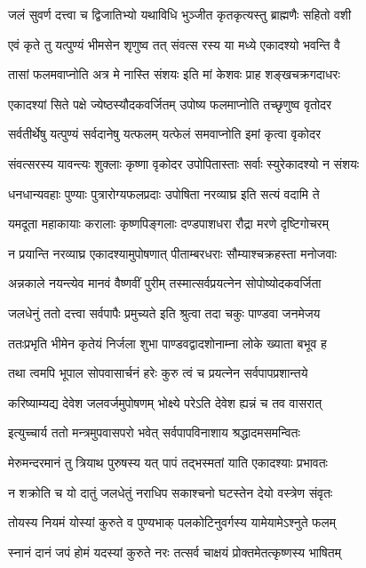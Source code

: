 \twolineshloka
{जलं सुवर्ण दत्त्वा च द्विजातिभ्यो यथाविधि}
{भुञ्जीत कृतकृत्यस्तु ब्राह्मणैः सहितो वशी} %

\twolineshloka
{एवं कृते तु यत्पुण्यं भीमसेन शृणुष्व तत्}
{संवत्स रस्य या मध्ये एकादश्यो भवन्ति वै} %

\twolineshloka
{तासां फलमवाप्नोति अत्र मे नास्ति संशयः}
{इति मां केशवः प्राह शङ्खचक्रगदाधरः} %

\twolineshloka
{एकादश्यां सिते पक्षे ज्येष्ठस्यौदकवर्जितम्}
{उपोष्य फलमाप्नोति तच्छृणुष्व वृतोदर} %

\twolineshloka
{सर्वतीर्थेषु यत्पुण्यं सर्वदानेषु यत्फलम्}
{यत्फेलं समवाप्नोति इमां कृत्वा वृकोदर} %

\twolineshloka
{संवत्सरस्य यावन्त्यः शुक्लाः कृष्णा वृकोदर}
{उपोपितास्ताः सर्वाः स्युरेकादश्यो न संशयः} %

\twolineshloka
{धनधान्यवहाः पुण्याः पुत्रारोग्यफलप्रदाः}
{उपोषिता नरव्याघ्र इति सत्यं वदामि ते} %

\twolineshloka
{यमदूता महाकायाः करालाः कृष्णपिङ्गलाः}
{दण्डपाशधरा रौद्रा मरणे दृष्टिगोचरम्} %

\twolineshloka
{न प्रयान्ति नरव्याघ्र एकादश्यामुपोषणात्}
{पीताम्बरधराः सौम्याश्चक्रहस्ता मनोजवाः} %

\twolineshloka
{अन्नकाले नयन्त्येव मानवं वैष्णवीं पुरीम्}
{तस्मात्सर्वप्रयत्नेन सोपोष्योदकवर्जिता} %

\twolineshloka
{जलधेनुं ततो दत्त्वा सर्वपापैः प्रमुच्यते}
{इति श्रुत्वा तदा चकुः पाण्डवा जनमेजय} %

\twolineshloka
{ततःप्रभृति भीमेन कृतेयं निर्जला शुभा}
{पाण्डवद्वादशोनाम्ना लोके ख्याता बभूव ह} %

\twolineshloka
{तथा त्वमपि भूपाल सोपवासार्चनं हरेः}
{कुरु त्वं च प्रयत्नेन सर्वपापप्रशान्तये} %

\twolineshloka
{करिष्याम्यद्य देवेश जलवर्जमुपोषणम्}
{भोक्ष्ये परेऽति देवेश ह्यन्नं च तव वासरात्} %

\twolineshloka
{इत्युच्चार्य ततो मन्त्रमुपवासपरो भवेत्}
{सर्वपापविनाशाय श्रद्धादमसमन्वितः} %

\twolineshloka
{मेरुमन्दरमानं तु त्रियाथ पुरुषस्य यत्}
{पापं तद्भस्मतां याति एकादश्याः प्रभावतः} %

\twolineshloka
{न शक्रोति च यो दातुं जलधेतुं नराधिप}
{सकाश्चनो घटस्तेन देयो वस्त्रेण संवृतः} %

\twolineshloka
{तोयस्य नियमं योस्यां कुरुते व पुण्यभाक्}
{पलकोटिनुवर्गस्य यामेयामेऽश्नुते फलम्} %

\twolineshloka
{स्नानं दानं जपं होमं यदस्यां कुरुते नरः}
{तत्सर्व चाक्षयं प्रोक्तमेतत्कृष्णस्य भाषितम्} %

